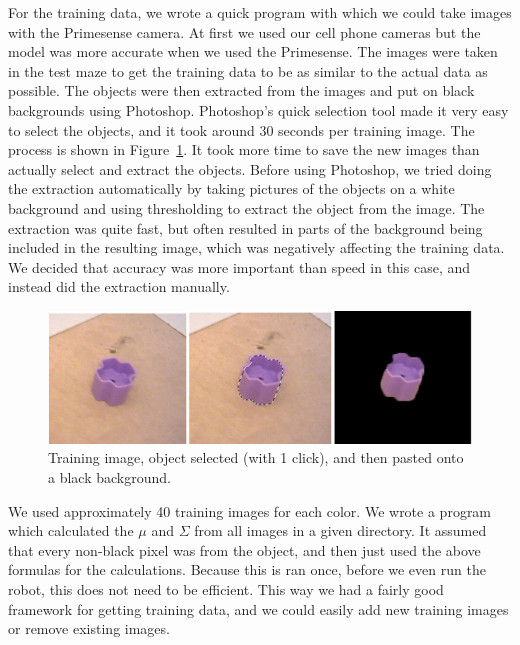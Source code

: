 For the training data, we wrote a quick program with which we could take images
with the Primesense camera. At first we used our cell phone cameras but the
model was more accurate when we used the Primesense. The images were taken in
the test maze to get the training data to be as similar to the actual data as
possible. The objects were then extracted from the images and put on black
backgrounds using Photoshop. Photoshop’s quick selection tool made it very easy
to select the objects, and it took around 30 seconds per training image. The
process is shown in Figure~\ref{fig:purpim}. It took more time to save the new
images than actually select and extract the objects. Before using Photoshop, we
tried doing the extraction automatically by taking pictures of the objects on a
white background and using thresholding to extract the object from the image.
The extraction was quite fast, but often resulted in parts of the background
being included in the resulting image, which was negatively affecting the
training data. We decided that accuracy was more important than speed in this
case, and instead did the extraction manually.
\begin{figure}
  \centering
  \includegraphics[width=\linewidth]{images/purpim.png}
  \caption{Training image, object selected (with 1 click), and then pasted onto a black background.}
  \label{fig:purpim}
\end{figure}
We used approximately 40 training images for each color. We wrote a program
which calculated the $\mu$ and $\Sigma$ from all images in a given directory. It
assumed that every non-black pixel was from the object, and then just used the
above formulas for the calculations. Because this is ran once, before we even
run the robot, this does not need to be efficient. This way we had a fairly good
framework for getting training data, and we could easily add new training images
or remove existing images.
